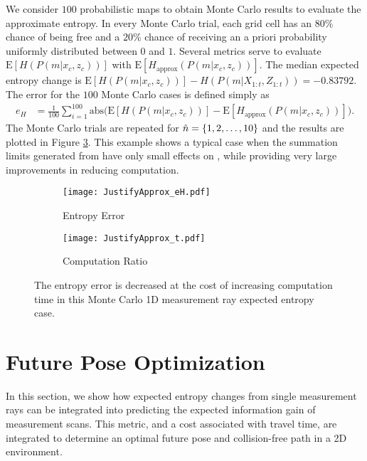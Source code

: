 We consider $100$ probabilistic maps to obtain Monte Carlo results to evaluate the approximate entropy. In every Monte Carlo trial, each grid cell has an $80\%$ chance of being free and a $20\%$ chance of receiving an a priori probability uniformly distributed between $0$ and $1$. 
Several metrics serve to evaluate $\text{E}[H(P(m|x_c,z_{c}))]$ with $\text{E}[H_\text{approx}(P(m|x_c,z_{c}))]$. The median expected entropy change is $\text{E}[H(P(m|x_c,z_{c}))]-H(P(m|X_{1:t},Z_{1:t}))=-0.83792$. The error for the $100$ Monte Carlo cases is defined simply as
\begin{align}
e_{H}&=\frac1{100}\sum_{i=1}^{100}\text{abs}\bigg(\text{E}[H(P(m|x_c,z_{c}))]-\text{E}[H_\text{approx}(P(m|x_c,z_{c}))]\bigg).
\end{align}
The Monte Carlo trials are repeated for $\hat n=\left\{ 1,2,\ldots,10 \right\}$ and the results are plotted in Figure \ref{fig:ApproxJust}.
This example shows a typical case when the summation limits generated from  have only small effects on , while providing very large improvements in reducing computation.

\begin{figure}
	\centering
    	\begin{subfigure}[b]{0.45\textwidth}
        		\texttt{[image: JustifyApprox\_eH.pdf]}
        		\caption{Entropy Error}
        		\label{fig:H_err}
    	\end{subfigure}
	\begin{subfigure}[b]{0.45\textwidth}
        		\texttt{[image: JustifyApprox\_t.pdf]}
        		\caption{Computation Ratio}
        		\label{fig:H_comp_ratio}
    	\end{subfigure}
\caption{The entropy error is decreased at the cost of increasing computation time in this Monte Carlo 1D measurement ray expected entropy case.}
\label{fig:ApproxJust}
\end{figure}





\section{Future Pose Optimization}

In this section, we show how expected entropy changes from single measurement rays can be integrated into predicting the expected information gain of measurement scans. This metric, and a cost associated with travel time, are integrated to determine an optimal future pose and collision-free path in a 2D environment.

